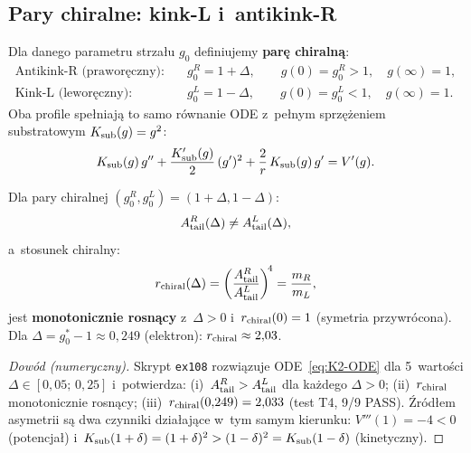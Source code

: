 \subsection{Pary chiralne: kink-L i~antikink-R}\label{app:K2-pary}

\begin{definition}\label{def:K2-chiral-pair}
Dla danego parametru strzału $g_0$ definiujemy \textbf{parę chiralną}:
\begin{align}
  \text{Antikink-R (praworęczny):} &\quad g_0^R = 1 + \Delta,
    \qquad g(0) = g_0^R > 1,\quad g(\infty) = 1, \label{eq:K2-right}\\
  \text{Kink-L (leworęczny):} &\quad g_0^L = 1 - \Delta,
    \qquad g(0) = g_0^L < 1,\quad g(\infty) = 1. \label{eq:K2-left}
\end{align}
Oba profile spe\l{}niaj\k{a} to samo r\'ownanie ODE
z~pe\l{}nym sprzę\.zeniem substratowym $K_{\rm sub}(g) = g^2$:
\begin{equation}\label{eq:K2-ODE}
  K_{\rm sub}(g)\,g''
  + \frac{K_{\rm sub}'(g)}{2}\,(g')^2
  + \frac{2}{r}\,K_{\rm sub}(g)\,g'
  = V'(g).
\end{equation}
\end{definition}

\begin{proposition}\label{prop:K2-Atail-asym}
Dla pary chiralnej $(g_0^R, g_0^L) = (1+\Delta, 1-\Delta)$:
\begin{equation}\label{eq:K2-Atail-ratio}
  A_{\rm tail}^R(\Delta) \neq A_{\rm tail}^L(\Delta),
\end{equation}
a~stosunek chiralny:
\begin{equation}\label{eq:K2-rchiral}
  r_{\rm chiral}(\Delta)
  = \left(\frac{A_{\rm tail}^R}{A_{\rm tail}^L}\right)^{\!4}
  = \frac{m_R}{m_L},
\end{equation}
jest \textbf{monotonicznie rosn\k{a}cy} z~$\Delta > 0$
i~$r_{\rm chiral}(0) = 1$ (symetria przywr\'ocona).
Dla $\Delta = g_0^* - 1 \approx 0{,}249$ (elektron):
$r_{\rm chiral} \approx 2{,}03$.
\end{proposition}

\begin{proof}[Dow\'od (numeryczny)]
Skrypt \texttt{ex108} rozwi\k{a}zuje ODE~\eqref{eq:K2-ODE}
dla 5~warto\'sci $\Delta \in [0{,}05;\, 0{,}25]$ i~potwierdza:
(i)~$A_{\rm tail}^R > A_{\rm tail}^L$ dla ka\.zdego $\Delta > 0$;
(ii)~$r_{\rm chiral}$ monotonicznie rosn\k{a}cy;
(iii)~$r_{\rm chiral}(0{,}249) = 2{,}033$ (test T4, 9/9 PASS).
\'Zr\'od\l{}em asymetrii s\k{a} dwa czynniki dzia\l{}aj\k{a}ce
w~tym samym kierunku:
$V'''(1) = -4 < 0$ (potencja\l{}) i~$K_{\rm sub}(1+\delta)
= (1+\delta)^2 > (1-\delta)^2 = K_{\rm sub}(1-\delta)$ (kinetyczny).
\end{proof}

